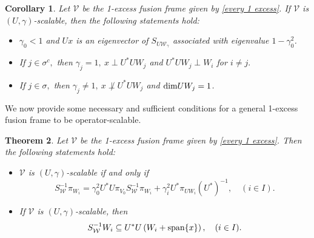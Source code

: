 \documentclass[sn-mathphys-num]{sn-jnl}%
\newtheorem{theorem}{Theorem}[section]
\newtheorem{corollary}[theorem]{Corollary}
\theoremstyle{definition}
\theoremstyle{remark}
\numberwithin{equation}{section}
\begin{document}
\begin{corollary}\label{erer}
Let $\mathcal{V}$ be the 1-excess fusion frame given by \eqref{every 1 excess}. If $\mathcal{V}$ is $(U,\gamma)$-scalable, then the following statements hold: 
\begin{itemize}
\item[$(i)$] $\gamma_{0}< 1$ and $Ux$ is an eigenvector of $S_{U\mathcal{W}_\gamma}$ associated with eigenvalue $1-\gamma_{0}^2$.
\item[$(ii)$]  If $ j \in \sigma^{c},$ then $\gamma_{j}=1,~x \perp U^{*}UW_{j}$ and $U^{*}UW_{j}\perp W_{i}$ for $i\neq j.$ 
\item[$(iii)$]  If $ j\in \sigma,$ then $\gamma_{j}\neq 1,~x \not\perp U^{*}UW_{j}$ and $\textnormal{dim}UW_{j}=1$.
\end{itemize}
\end{corollary}

We now provide some necessary and sufficient conditions for a general 1-excess fusion frame to be operator-scalable. 

\begin{theorem}
Let $\mathcal{V}$ be the 1-excess fusion frame given by \eqref{every 1 excess}. Then the following statements hold:
\begin{itemize}
\item[$(i)$] $\mathcal{V}$ is $(U,\gamma)$-scalable if and only if 
\begin{equation}\label{Suw}
S_{\mathcal{W}}^{-1}\pi_{W_{i}} =\gamma_{0}^{2}U^{*}U\pi_{V_{0}}S_{\mathcal{W}}^{-1}\pi_{W_{i}}+\gamma_{i}^{2}U^{*}\pi_{UW_{i}}\left( U^{*}\right) ^{-1}, \quad (i \in I).
\end{equation}
\item[$(ii)$] If $\mathcal{V}$ is $(U,\gamma)$-scalable, then 
\begin{equation*}
S_{\mathcal{W}}^{-1}W_{i} \subseteq U^{*}U\left( W_{i}+\textnormal{span}\{x\}\right) , \quad (i \in I). 
\end{equation*} 
\end{itemize}
\end{theorem}
\end{document}
